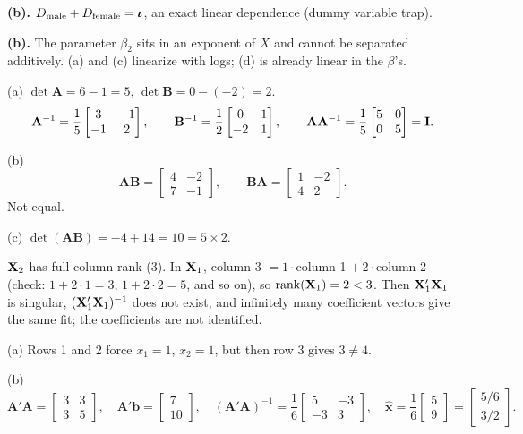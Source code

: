 \documentclass[11pt]{article}
\begin{document}
 \textbf{(b).} $D_{\text{male}}+D_{\text{female}}=\bm{\iota}$, an exact linear dependence (dummy variable trap).

 \textbf{(b).} The parameter $\beta_2$ sits in an exponent of $X$ and cannot be separated additively. (a) and (c) linearize with logs; (d) is already linear in the $\beta$'s.

(a) $\det\mathbf A=6-1=5$, $\det\mathbf B=0-(-2)=2$.
\[ \mathbf A^{-1}=\frac15\begin{bmatrix}3&-1\\-1&2\end{bmatrix}, \qquad \mathbf B^{-1}=\frac12\begin{bmatrix}0&1\\-2&1\end{bmatrix}, \qquad \mathbf A\mathbf A^{-1}=\frac15\begin{bmatrix}5&0\\0&5\end{bmatrix}=\mathbf{I}. \]

(b)
\[ \mathbf{AB}=\begin{bmatrix}4&-2\\7&-1\end{bmatrix}, \qquad \mathbf{BA}=\begin{bmatrix}1&-2\\4&2\end{bmatrix}. \]
Not equal.

(c) $\det(\mathbf{AB})=-4+14=10=5\times2$.

 $\mathbf{X}_2$ has full column rank (3). In $\mathbf{X}_1$, column 3 $=1\cdot$column 1 $+\,2\cdot$column 2 (check: $1+2\cdot1=3$, $1+2\cdot2=5$, and so on), so $\operatorname{rank}(\mathbf{X}_1)=2<3$. Then $\mathbf{X}_1'\mathbf{X}_1$ is singular, $(\mathbf{X}_1'\mathbf{X}_1)^{-1}$ does not exist, and infinitely many coefficient vectors give the same fit; the coefficients are not identified.

(a) Rows 1 and 2 force $x_1=1$, $x_2=1$, but then row 3 gives $3\neq4$.

(b)
\[ \mathbf A'\mathbf A=\begin{bmatrix}3&3\\3&5\end{bmatrix}, \quad \mathbf A'\mathbf b=\begin{bmatrix}7\\10\end{bmatrix}, \quad (\mathbf A'\mathbf A)^{-1}=\frac16\begin{bmatrix}5&-3\\-3&3\end{bmatrix}, \quad \hat{\mathbf x}=\frac16\begin{bmatrix}5\\9\end{bmatrix}=\begin{bmatrix}5/6\\3/2\end{bmatrix}. \]
\end{document}
